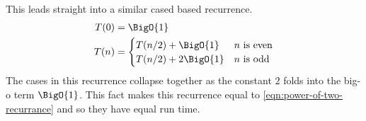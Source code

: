 \documentclass[./Thesis.tex]{subfiles}
\begin{document}
This leads straight into a similar cased based recurrence.
\begin{align}
  \label{eqn:squaring-recurrance}
  \begin{split}
    T(0) &= \BigO{1} \\
    T(n) &=
    \begin{cases}
      T(n / 2) + \BigO{1} & n \text{ is even} \\
      T(n / 2) + 2 \BigO{1} & n \text{ is odd} \\
  \end{cases}
  \end{split}
\end{align}
The cases in this recurrence collapse together as the constant $2$ folds into
the big-o term $\BigO{1}$. This fact makes this recurrence equal to
\ref{eqn:power-of-two-recurrance} and so they have equal run time.
\end{document}
